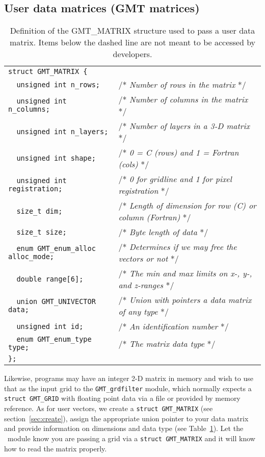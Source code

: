 \documentclass[11pt]{report}
\begin{document}
\subsection{User data matrices (GMT matrices)}

\begin{table}[h]
\small
\centering
\begin{tabular}{ll} \hline
\verb!struct GMT_MATRIX {!               & \\
\verb!  unsigned int n_rows;!            & /* \emph{Number of rows in the matrix} */ \\
\verb!  unsigned int n_columns;!         & /* \emph{Number of columns in the matrix} */\\
\verb!  unsigned int n_layers;!          & /* \emph{Number of layers in a 3-D matrix} */\\
\verb!  unsigned int shape;!             & /* \emph{0 = C (rows) and 1 = Fortran (cols)} */\\
\verb!  unsigned int registration;!      & /* \emph{0 for gridline and 1 for pixel registration} */\\
\verb!  size_t dim;!                     & /* \emph{Length of dimension for row (C) or column (Fortran)} */\\
\verb!  size_t size;!                    & /* \emph{Byte length of data} */\\
\verb!  enum GMT_enum_alloc alloc_mode;! & /* \emph{Determines if we may free the vectors or not} */\\
\verb!  double range[6];!                & /* \emph{The min and max limits on x-, y-, and z-ranges} */\\
\verb!  union GMT_UNIVECTOR data;!       & /* \emph{Union with pointers a data matrix of any type} */\\ \hdashline
\verb!  unsigned int id;!                & /* \emph{An identification number} */ \\
\verb!  enum GMT_enum_type type;!        & /* \emph{The matrix data type} */\\
\verb!};!                              & \\ \hline
\end{tabular}
\caption{Definition of the GMT\_MATRIX structure used to pass a user data matrix. Items below the dashed
line are not meant to be accessed by developers.}
\label{tbl:matrix}
\end{table}
\noindent
Likewise, programs may have an integer 2-D matrix in memory 
and wish to use that as the input grid to the \texttt{GMT\_grdfilter} module, which normally
expects a \texttt{struct GMT\_GRID} with floating point data via a file or provided by memory reference.  As for user vectors, we create a
\texttt{struct GMT\_MATRIX} (see section~\ref{sec:create}), assign the appropriate union pointer to your data
matrix and provide information on dimensions and data type (see Table~\ref{tbl:matrix}).
Let the \GMT\ module know you are passing a grid via a
\texttt{struct GMT\_MATRIX} and it will know how to read the matrix properly.
\end{document}
